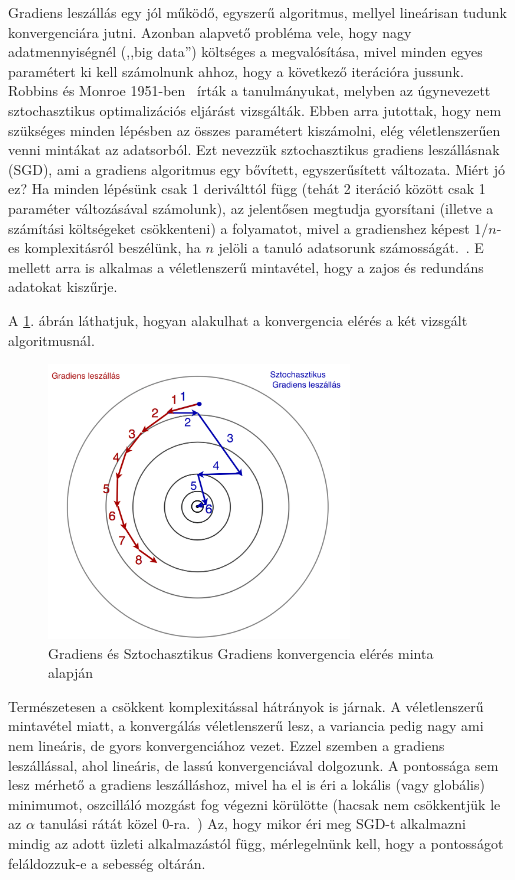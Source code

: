\documentclass[a4paper,12pt]{article}
\begin{document}
Gradiens leszállás egy jól működő, egyszerű algoritmus, mellyel lineárisan tudunk konvergenciára jutni. Azonban alapvető probléma vele, hogy nagy adatmennyiségnél (,,big data'') költséges a megvalósítása, mivel minden egyes paramétert ki kell számolnunk ahhoz, hogy a következő iterációra jussunk. Robbins és Monroe 1951-ben~\cite{stoch1951} írták a tanulmányukat, melyben az úgynevezett sztochasztikus optimalizációs eljárást vizsgálták. Ebben arra jutottak, hogy nem szükséges minden lépésben az összes paramétert kiszámolni, elég véletlenszerűen venni mintákat az adatsorból. Ezt nevezzük sztochasztikus gradiens leszállásnak (SGD), ami a gradiens algoritmus egy bővített, egyszerűsített változata. \newline
Miért jó ez? Ha minden lépésünk csak 1 deriválttól függ (tehát 2 iteráció között csak 1 paraméter változásával számolunk), az jelentősen megtudja gyorsítani (illetve a számítási költségeket csökkenteni) a folyamatot, mivel a gradienshez képest $1/n$-es komplexitásról beszélünk, ha $n$ jelöli a tanuló adatsorunk számosságát.~\cite{asgd}. E mellett arra is alkalmas a véletlenszerű mintavétel, hogy a zajos és redundáns adatokat kiszűrje.~\cite{gatsby} \newline

A \ref{sgd_bgd}. ábrán láthatjuk, hogyan alakulhat a konvergencia elérés a két vizsgált algoritmusnál. 

\begin{figure}[H]
\centering
\includegraphics[width=80mm]{img/sgd_bgd.png}
\caption{Gradiens és Sztochasztikus Gradiens konvergencia elérés minta~\cite{alfa} alapján \label{sgd_bgd}}
\end{figure}

Természetesen a csökkent komplexitással hátrányok is járnak. A véletlenszerű mintavétel miatt, a konvergálás véletlenszerű lesz, a variancia pedig nagy ami nem lineáris, de gyors konvergenciához vezet. Ezzel szemben a gradiens leszállással, ahol lineáris, de lassú konvergenciával dolgozunk. A pontossága sem lesz mérhető a gradiens leszálláshoz, mivel ha el is éri a lokális (vagy globális) minimumot, oszcilláló mozgást fog végezni körülötte (hacsak nem csökkentjük le az $\alpha$ tanulási rátát közel 0-ra.~\cite{bottou})
Az, hogy mikor éri meg SGD-t alkalmazni mindig az adott üzleti alkalmazástól függ, mérlegelnünk kell, hogy a pontosságot feláldozzuk-e a sebesség oltárán. \newline
\end{document}
